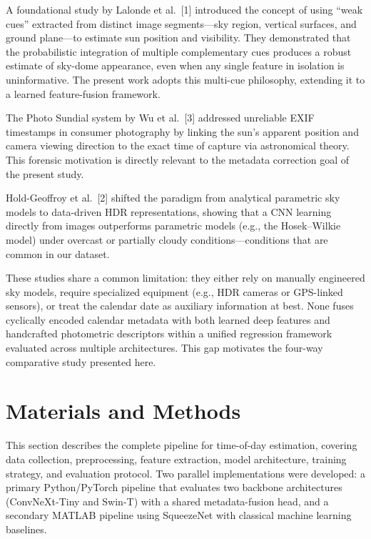 \documentclass[9pt, a4paper, twocolumn]{article}
\begin{document}
A foundational study by Lalonde et al.~[1] introduced the concept of using ``weak cues'' extracted from distinct image segments---sky region, vertical surfaces, and ground plane---to estimate sun position and visibility. They demonstrated that the probabilistic integration of multiple complementary cues produces a robust estimate of sky-dome appearance, even when any single feature in isolation is uninformative. The present work adopts this multi-cue philosophy, extending it to a learned feature-fusion framework.

The Photo Sundial system by Wu et al.~[3] addressed unreliable EXIF timestamps in consumer photography by linking the sun's apparent position and camera viewing direction to the exact time of capture via astronomical theory. This forensic motivation is directly relevant to the metadata correction goal of the present study.

Hold-Geoffroy et al.~[2] shifted the paradigm from analytical parametric sky models to data-driven HDR representations, showing that a CNN learning directly from images outperforms parametric models (e.g., the Hosek--Wilkie model) under overcast or partially cloudy conditions---conditions that are common in our dataset.

These studies share a common limitation: they either rely on manually engineered sky models, require specialized equipment (e.g., HDR cameras or GPS-linked sensors), or treat the calendar date as auxiliary information at best. None fuses cyclically encoded calendar metadata with both learned deep features and handcrafted photometric descriptors within a unified regression framework evaluated across multiple architectures. This gap motivates the four-way comparative study presented here.


\section{Materials and Methods}

This section describes the complete pipeline for time-of-day estimation, covering data collection, preprocessing, feature extraction, model architecture, training strategy, and evaluation protocol. Two parallel implementations were developed: a primary Python/PyTorch pipeline that evaluates two backbone architectures (ConvNeXt-Tiny and Swin-T) with a shared metadata-fusion head, and a secondary MATLAB pipeline using SqueezeNet with classical machine learning baselines.
\end{document}
